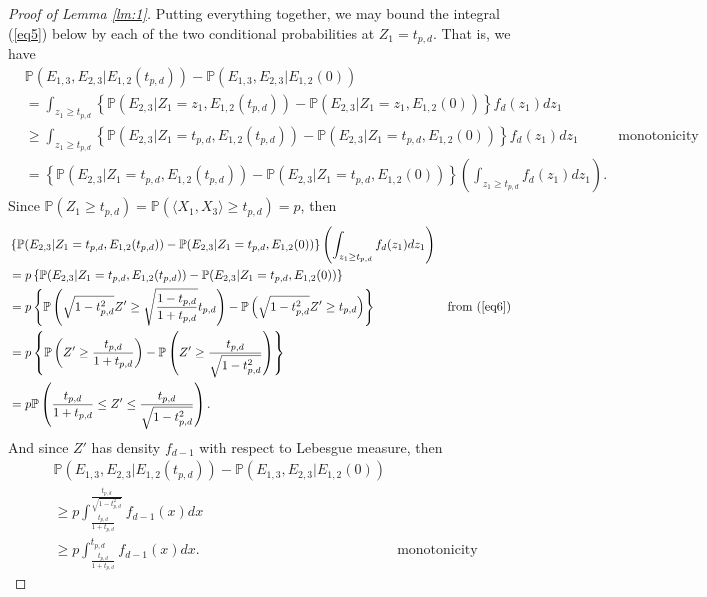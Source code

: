 \documentclass{article}
\begin{document}
\begin{proof}[Proof of Lemma \ref{lm:1}]
Putting everything together, we may bound the integral (\ref{eq5}) below by each of the two conditional probabilities at $Z_1 = t_{p,d}$. That is, we have
\begin{align*}
    &\mathbb{P}(E_{1,3}, E_{2,3} | E_{1,2}(t_{p,d})) - \mathbb{P}(E_{1,3},E_{2,3}| E_{1,2}(0))\\
    &= \int_{z_1 \geq t_{p, d}} \left\{ \mathbb{P} (E_{2,3} | Z_1 = z_1, E_{1,2}(t_{p,d}))  -  \mathbb{P} (E_{2,3} | Z_1 = z_1, E_{1,2}(0)) \right\} f_d(z_1) d z_1\\
    &\geq \int_{z_1 \geq t_{p, d}} \left\{ \mathbb{P} (E_{2,3} | Z_1 = t_{p,d}, E_{1,2}(t_{p,d}))  -  \mathbb{P} (E_{2,3} | Z_1 = t_{p,d}, E_{1,2}(0)) \right\} f_d(z_1) d z_1 & \text{monotonicity}\\
    &= \left\{ \mathbb{P} (E_{2,3} | Z_1 = t_{p,d}, E_{1,2}(t_{p,d}))  -  \mathbb{P} (E_{2,3} | Z_1 = t_{p,d}, E_{1,2}(0)) \right\} \left( \int_{z_1 \geq t_{p, d}} f_d(z_1) d z_1 \right).
\end{align*}
Since $\mathbb{P}(Z_1 \geq t_{p,d}) = \mathbb{P}(\langle X_1, X_3 \rangle \geq t_{p,d}) = p$, then 
\begin{align*}
    &\left\{ \mathbb{P} (E_{2,3} | Z_1 = t_{p,d}, E_{1,2}(t_{p,d}))  -  \mathbb{P} (E_{2,3} | Z_1 = t_{p,d}, E_{1,2}(0)) \right\} \left( \int_{z_1 \geq t_{p, d}} f_d(z_1) d z_1 \right)\\
    &= p \left\{ \mathbb{P} (E_{2,3} | Z_1 = t_{p,d}, E_{1,2}(t_{p,d}))  -  \mathbb{P} (E_{2,3} | Z_1 = t_{p,d}, E_{1,2}(0)) \right\}\\
    &= p \left\{ \mathbb{P} \left( \sqrt{1 - t_{p,d}^2} Z' \geq \sqrt{\frac{1-t_{p,d}}{1+t_{p,d}}} t_{p,d} \right)  -  \mathbb{P} \left( \sqrt{1 - t_{p,d}^2}Z' \geq t_{p,d} \right) \right\} & \text{from (\ref{eq6})}\\
    &= p \left\{ \mathbb{P} \left( Z' \geq \frac{t_{p,d}}{1 + t_{p,d}} \right)  -  \mathbb{P} \left(Z' \geq \frac{t_{p,d}}{ \sqrt{1 - t_{p,d}^2}} \right) \right\}\\
    &= p \mathbb{P}\left( \frac{t_{p,d}}{1 + t_{p,d}} \leq Z' \leq \frac{t_{p,d}}{ \sqrt{1 - t_{p,d}^2}}  \right).
\end{align*}
And since $Z'$ has density $f_{d-1}$ with respect to Lebesgue measure, then 
\begin{align*}
    &\mathbb{P}(E_{1,3}, E_{2,3} | E_{1,2}(t_{p,d})) - \mathbb{P}(E_{1,3},E_{2,3}| E_{1,2}(0))\\
    &\geq p\int_{\frac{t_{p,d}}{1 + t_{p,d}}}^{\frac{t_{p,d}}{ \sqrt{1 - t_{p,d}^2}}} f_{d-1}(x) dx\\
    & \geq p\int_{\frac{t_{p,d}}{1 + t_{p,d}}}^{t_{p,d}} f_{d-1}(x) dx. & \text{monotonicity}
\end{align*}


\end{proof}
\end{document}
